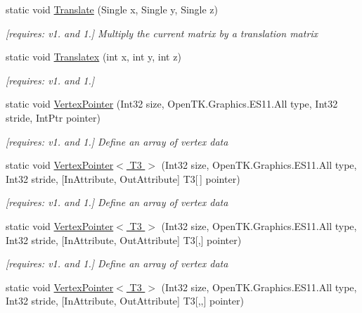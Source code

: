 \begin{DoxyCompactItemize}
static void \hyperlink{class_open_t_k_1_1_graphics_1_1_e_s11_1_1_g_l_a379aea5586cd5e20afab435ae21f827b}{Translate} (Single x, Single y, Single z)
\begin{DoxyCompactList}\small\item\em \mbox{[}requires\-: v1. and 1.\mbox{]} Multiply the current matrix by a translation matrix \end{DoxyCompactList}\item 
static void \hyperlink{class_open_t_k_1_1_graphics_1_1_e_s11_1_1_g_l_a21d1b532df1e0a5088e5d1e1a89935f9}{Translatex} (int x, int y, int z)
\begin{DoxyCompactList}\small\item\em \mbox{[}requires\-: v1. and 1.\mbox{]}\end{DoxyCompactList}\item 
static void \hyperlink{class_open_t_k_1_1_graphics_1_1_e_s11_1_1_g_l_ae8077599f3bb9a1022436225202fa0b5}{Vertex\-Pointer} (Int32 size, Open\-T\-K.\-Graphics.\-E\-S11.\-All type, Int32 stride, Int\-Ptr pointer)
\begin{DoxyCompactList}\small\item\em \mbox{[}requires\-: v1. and 1.\mbox{]} Define an array of vertex data \end{DoxyCompactList}\item 
static void \hyperlink{class_open_t_k_1_1_graphics_1_1_e_s11_1_1_g_l_a520771b1f836ce8e4cbd07e48a55230c}{Vertex\-Pointer$<$ T3 $>$} (Int32 size, Open\-T\-K.\-Graphics.\-E\-S11.\-All type, Int32 stride, \mbox{[}In\-Attribute, Out\-Attribute\mbox{]} T3\mbox{[}$\,$\mbox{]} pointer)
\begin{DoxyCompactList}\small\item\em \mbox{[}requires\-: v1. and 1.\mbox{]} Define an array of vertex data \end{DoxyCompactList}\item 
static void \hyperlink{class_open_t_k_1_1_graphics_1_1_e_s11_1_1_g_l_a17da6ce073f937f6e09719ceaffb7da1}{Vertex\-Pointer$<$ T3 $>$} (Int32 size, Open\-T\-K.\-Graphics.\-E\-S11.\-All type, Int32 stride, \mbox{[}In\-Attribute, Out\-Attribute\mbox{]} T3\mbox{[},\mbox{]} pointer)
\begin{DoxyCompactList}\small\item\em \mbox{[}requires\-: v1. and 1.\mbox{]} Define an array of vertex data \end{DoxyCompactList}\item 
static void \hyperlink{class_open_t_k_1_1_graphics_1_1_e_s11_1_1_g_l_aea9a6e2cd0e18c1cc518aa293f2d844d}{Vertex\-Pointer$<$ T3 $>$} (Int32 size, Open\-T\-K.\-Graphics.\-E\-S11.\-All type, Int32 stride, \mbox{[}In\-Attribute, Out\-Attribute\mbox{]} T3\mbox{[},,\mbox{]} pointer)

\end{DoxyCompactItemize}

